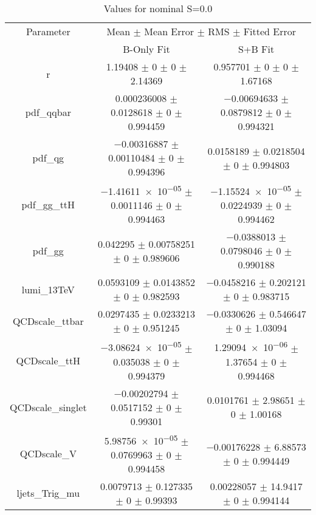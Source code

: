 \begin{table}
\centering
\caption{Values for nominal S=0.0}
\begin{tabular}{ccc}
\toprule
Parameter & \multicolumn{2}{c}{Mean $\pm$ Mean Error $\pm$ RMS $\pm$ Fitted Error}\\
 & B-Only Fit & S+B Fit\\
\midrule
r & \num{1.19408} $\pm$ \num{0} $\pm$ \num{0} $\pm$ \num{2.14369} & \num{0.957701} $\pm$ \num{0} $\pm$ \num{0} $\pm$ \num{1.67168}\\
pdf\_qqbar & \num{0.000236008} $\pm$ \num{0.0128618} $\pm$ \num{0} $\pm$ \num{0.994459} & \num{-0.00694633} $\pm$ \num{0.0879812} $\pm$ \num{0} $\pm$ \num{0.994321}\\
pdf\_qg & \num{-0.00316887} $\pm$ \num{0.00110484} $\pm$ \num{0} $\pm$ \num{0.994396} & \num{0.0158189} $\pm$ \num{0.0218504} $\pm$ \num{0} $\pm$ \num{0.994803}\\
pdf\_gg\_ttH & \num{-1.41611e-05} $\pm$ \num{0.0011146} $\pm$ \num{0} $\pm$ \num{0.994463} & \num{-1.15524e-05} $\pm$ \num{0.0224939} $\pm$ \num{0} $\pm$ \num{0.994462}\\
pdf\_gg & \num{0.042295} $\pm$ \num{0.00758251} $\pm$ \num{0} $\pm$ \num{0.989606} & \num{-0.0388013} $\pm$ \num{0.0798046} $\pm$ \num{0} $\pm$ \num{0.990188}\\
lumi\_13TeV & \num{0.0593109} $\pm$ \num{0.0143852} $\pm$ \num{0} $\pm$ \num{0.982593} & \num{-0.0458216} $\pm$ \num{0.202121} $\pm$ \num{0} $\pm$ \num{0.983715}\\
QCDscale\_ttbar & \num{0.0297435} $\pm$ \num{0.0233213} $\pm$ \num{0} $\pm$ \num{0.951245} & \num{-0.0330626} $\pm$ \num{0.546647} $\pm$ \num{0} $\pm$ \num{1.03094}\\
QCDscale\_ttH & \num{-3.08624e-05} $\pm$ \num{0.035038} $\pm$ \num{0} $\pm$ \num{0.994379} & \num{1.29094e-06} $\pm$ \num{1.37654} $\pm$ \num{0} $\pm$ \num{0.994468}\\
QCDscale\_singlet & \num{-0.00202794} $\pm$ \num{0.0517152} $\pm$ \num{0} $\pm$ \num{0.99301} & \num{0.0101761} $\pm$ \num{2.98651} $\pm$ \num{0} $\pm$ \num{1.00168}\\
QCDscale\_V & \num{5.98756e-05} $\pm$ \num{0.0769963} $\pm$ \num{0} $\pm$ \num{0.994458} & \num{-0.00176228} $\pm$ \num{6.88573} $\pm$ \num{0} $\pm$ \num{0.994449}\\
ljets\_Trig\_mu & \num{0.0079713} $\pm$ \num{0.127335} $\pm$ \num{0} $\pm$ \num{0.99393} & \num{0.00228057} $\pm$ \num{14.9417} $\pm$ \num{0} $\pm$ \num{0.994144}\\

\end{tabular}
\end{table}
